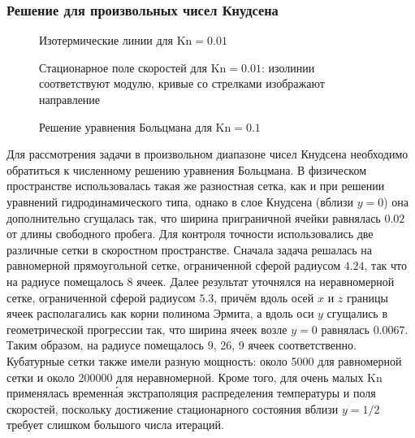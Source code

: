 \documentclass[
aps,%
12pt,%
final,%
notitlepage,%
oneside,%
onecolumn,%
nobibnotes,%
nofootinbib,%
superscriptaddress,%
noshowpacs,%
showkeys,%
centertags]%
{revtex4}
\newcommand{\Kn}{\mathrm{Kn}}
\begin{document}
\subsubsection{Решение для произвольных чисел Кнудсена}

\begin{figure}
    \centering
    \caption{Изотермические линии для \(\Kn=0.01\)}
    \label{fig:kn0.01:temp}
\end{figure}

\begin{figure}
    \centering
    \caption{Стационарное поле скоростей для \(\Kn=0.01\):
        изолинии соответствуют модулю, кривые со стрелками изображают направление}
    \label{fig:kn0.01:flow}
\end{figure}

\begin{figure}
    \centering
    \caption{Решение уравнения Больцмана для \(\Kn=0.1\)}
    \label{fig:kn0.1}
\end{figure}

Для рассмотрения задачи в произвольном диапазоне чисел Кнудсена необходимо
обратиться к численному решению уравнения Больцмана.
В физическом пространстве использовалась такая же разностная сетка,
как и при решении уравнений гидродинамического типа,
однако в слое Кнудсена (вблизи \(y=0\)) она дополнительно сгущалась так,
что ширина приграничной ячейки равнялась \(0.02\) от длины свободного пробега.
Для контроля точности использовались две различные сетки в скоростном пространстве.
Сначала задача решалась на равномерной прямоугольной сетке, ограниченной сферой радиусом \(4.24\),
так что на радиусе помещалось 8 ячеек.
Далее результат уточнялся на неравномерной сетке, ограниченной сферой радиусом \(5.3\),
причём вдоль осей \(x\) и \(z\) границы ячеек располагались как корни полинома Эрмита,
а вдоль оси \(y\) сгущались в геометрической прогрессии так,
что ширина ячеек возле \(y=0\) равнялась \(0.0067\).
Таким образом, на радиусе помещалось 9, 26, 9 ячеек соответственно.
Кубатурные сетки также имели разную мощность: около 5000 для равномерной сетки
и около 200000 для неравномерной.
Кроме того, для очень малых \(\Kn\) применялась временн\'{а}я экстраполяция распределения температуры
и поля скоростей, поскольку достижение стационарного состояния вблизи \(y=1/2\)
требует слишком большого числа итераций.
\end{document}
